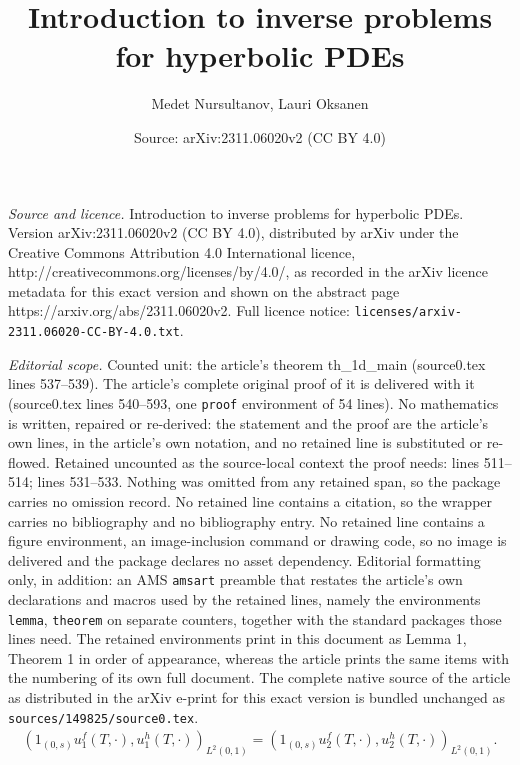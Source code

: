 \documentclass[10pt,a4paper]{amsart}
\title{Introduction to inverse problems for hyperbolic PDEs}
\author{Medet Nursultanov, Lauri Oksanen}
\date{Source: arXiv:2311.06020v2 (CC BY 4.0)}
\begin{document}
\maketitle

\noindent\emph{Source and licence.} Introduction to inverse problems for hyperbolic PDEs. Version arXiv:2311.06020v2 (CC BY 4.0), distributed by arXiv under the Creative Commons Attribution 4.0 International licence, http://creativecommons.org/licenses/by/4.0/, as recorded in the arXiv licence metadata for this exact version and shown on the abstract page https://arxiv.org/abs/2311.06020v2. Full licence notice: \texttt{licenses/arxiv-2311.06020-CC-BY-4.0.txt}.\par\smallskip

\noindent\textit{Editorial scope.} Counted unit: the article's theorem th\_1d\_main (source0.tex lines 537--539). The article's complete original proof of it is delivered with it (source0.tex lines 540--593, one \texttt{proof} environment of 54 lines). No mathematics is written, repaired or re-derived: the statement and the proof are the article's own lines, in the article's own notation, and no retained line is substituted or re-flowed.  Retained uncounted as the source-local context the proof needs: lines 511--514; lines 531--533.  Nothing was omitted from any retained span, so the package carries no omission record.  No retained line contains a citation, so the wrapper carries no bibliography and no bibliography entry.  No retained line contains a figure environment, an image-inclusion command or drawing code, so no image is delivered and the package declares no asset dependency.  Editorial formatting only, in addition: an AMS \texttt{amsart} preamble that restates the article's own declarations and macros used by the retained lines, namely the environments \texttt{lemma}, \texttt{theorem} on separate counters, together with the standard packages those lines need.  The retained environments print in this document as Lemma 1, Theorem 1 in order of appearance, whereas the article prints the same items with the numbering of its own full document.  The complete native source of the article as distributed in the arXiv e-print for this exact version is bundled unchanged as \texttt{sources/149825/source0.tex}.
	\begin{align}\label{scalar prod supp 0}
		\left(1_{(0,s)}u_1^f (T, \cdot), u_1^h (T, \cdot)\right)_{L^2(0,1)} =
		 \left(1_{(0,s)}u_2^f (T, \cdot), u_2^h (T, \cdot)\right)_{L^2(0,1)}.
	\end{align}
\end{document}
